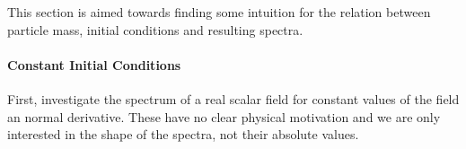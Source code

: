 This section is aimed towards finding some intuition for the relation between particle mass, initial conditions and resulting spectra.

\paragraph{Constant Initial Conditions}

First, investigate the spectrum of a real scalar field for constant values of the field an normal derivative. These have no clear physical motivation and we are only interested in the shape of the spectra, not their absolute values.\\
